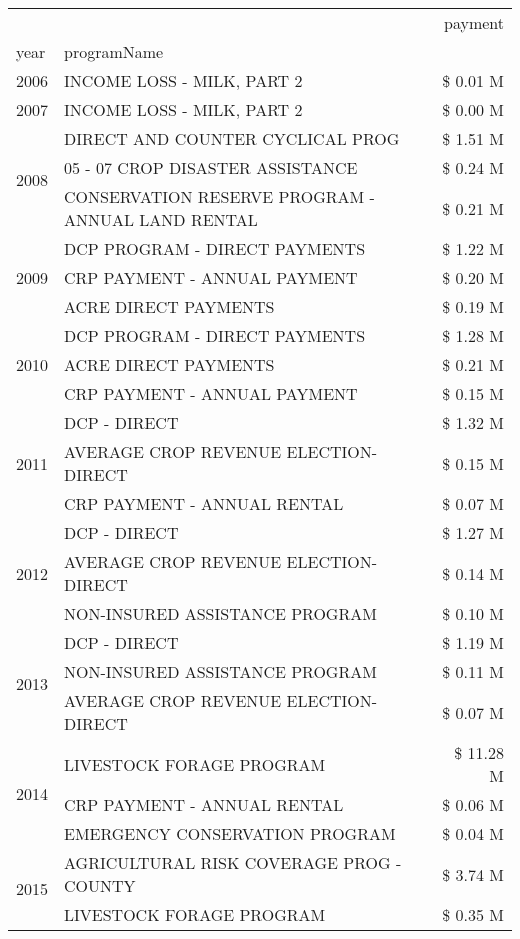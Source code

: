 \begin{tabular}{llr}
\toprule
 &  & payment \\
year & programName &  \\
\midrule
2006 & INCOME LOSS - MILK, PART 2 & \$ 0.01 M \\
\cline{1-3}
2007 & INCOME LOSS - MILK, PART 2 & \$ 0.00 M \\
\cline{1-3}
\multirow[t]{3}{*}{2008} & DIRECT AND COUNTER CYCLICAL PROG & \$ 1.51 M \\
 & 05 - 07 CROP DISASTER ASSISTANCE & \$ 0.24 M \\
 & CONSERVATION RESERVE PROGRAM - ANNUAL LAND RENTAL & \$ 0.21 M \\
\cline{1-3}
\multirow[t]{3}{*}{2009} & DCP PROGRAM - DIRECT PAYMENTS & \$ 1.22 M \\
 & CRP PAYMENT - ANNUAL PAYMENT & \$ 0.20 M \\
 & ACRE DIRECT PAYMENTS & \$ 0.19 M \\
\cline{1-3}
\multirow[t]{3}{*}{2010} & DCP PROGRAM - DIRECT PAYMENTS & \$ 1.28 M \\
 & ACRE DIRECT PAYMENTS & \$ 0.21 M \\
 & CRP PAYMENT - ANNUAL PAYMENT & \$ 0.15 M \\
\cline{1-3}
\multirow[t]{3}{*}{2011} & DCP - DIRECT & \$ 1.32 M \\
 & AVERAGE CROP REVENUE ELECTION-DIRECT & \$ 0.15 M \\
 & CRP PAYMENT - ANNUAL RENTAL & \$ 0.07 M \\
\cline{1-3}
\multirow[t]{3}{*}{2012} & DCP - DIRECT & \$ 1.27 M \\
 & AVERAGE CROP REVENUE ELECTION-DIRECT & \$ 0.14 M \\
 & NON-INSURED ASSISTANCE PROGRAM & \$ 0.10 M \\
\cline{1-3}
\multirow[t]{3}{*}{2013} & DCP - DIRECT & \$ 1.19 M \\
 & NON-INSURED ASSISTANCE PROGRAM & \$ 0.11 M \\
 & AVERAGE CROP REVENUE ELECTION-DIRECT & \$ 0.07 M \\
\cline{1-3}
\multirow[t]{3}{*}{2014} & LIVESTOCK FORAGE PROGRAM & \$ 11.28 M \\
 & CRP PAYMENT - ANNUAL RENTAL & \$ 0.06 M \\
 & EMERGENCY CONSERVATION PROGRAM & \$ 0.04 M \\
\cline{1-3}
\multirow[t]{3}{*}{2015} & AGRICULTURAL RISK COVERAGE PROG - COUNTY & \$ 3.74 M \\
 & LIVESTOCK FORAGE PROGRAM & \$ 0.35 M \\

\end{tabular}
